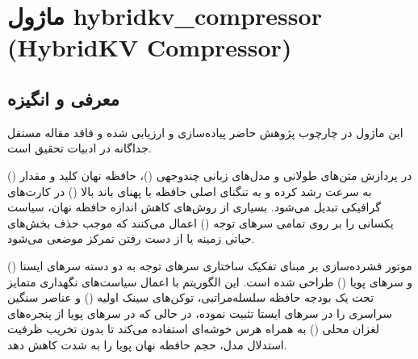 \section{ماژول hybridkv\_compressor (HybridKV Compressor)}
\label{sec:module_hybridkv_compressor}

\subsection{معرفی و انگیزه}
این ماژول در چارچوب پژوهش حاضر پیاده‌سازی و ارزیابی شده و فاقد مقاله مستقل جداگانه در ادبیات تحقیق است.

در پردازش متن‌های طولانی و مدل‌های زبانی چندوجهی ()، حافظه نهان کلید و مقدار () به سرعت رشد کرده و به تنگنای اصلی حافظه با پهنای باند بالا () در کارت‌های گرافیکی تبدیل می‌شود. بسیاری از روش‌های کاهش اندازه حافظه نهان، سیاست یکسانی را بر روی تمامی سرهای توجه () اعمال می‌کنند که موجب حذف بخش‌های حیاتی زمینه یا از دست رفتن تمرکز موضعی می‌شود.

موتور فشرده‌سازی  بر مبنای تفکیک ساختاری سرهای توجه به دو دسته سرهای ایستا () و سرهای پویا () طراحی شده است. این الگوریتم با اعمال سیاست‌های نگهداری متمایز تحت یک بودجه حافظه سلسله‌مراتبی، توکن‌های سینک اولیه () و عناصر سنگین سراسری را در سرهای ایستا تثبیت نموده، در حالی که در سرهای پویا از پنجره‌های لغزان محلی () به همراه هرس خوشه‌ای استفاده می‌کند تا بدون تخریب ظرفیت استدلال مدل، حجم حافظه نهان پویا را به شدت کاهش دهد.

